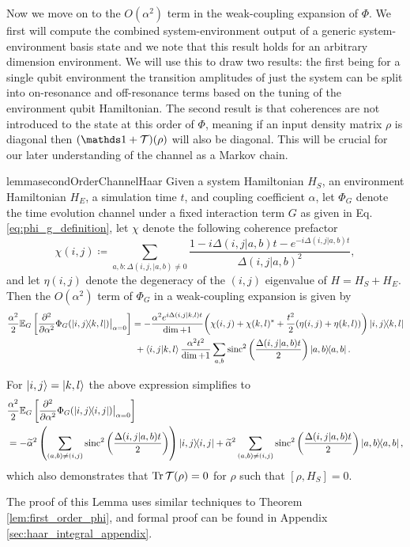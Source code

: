 Now we move on to the $O(\alpha^2)$ term in the weak-coupling expansion of $\Phi$. We first will compute the combined system-environment output of a generic system-environment basis state and we note that this result holds for an arbitrary dimension environment. We will use this to draw two results:  the first being for a single qubit environment the transition amplitudes of just the system can be split into on-resonance and off-resonance terms based on the tuning of the environment qubit Hamiltonian. The second result is that coherences are not introduced to the state at this order of $\Phi$, meaning if an input density matrix $\rho$ is diagonal then $(\identity + \mathcal{T})(\rho)$ will also be diagonal. This will be crucial for our later understanding of the channel as a Markov chain.
\begin{restatable}{lemma}{secondOrderChannelHaar} \label{lem:big_one}
    Given a system Hamiltonian $H_{S}$, an environment Hamiltonian $H_{E}$, a simulation time $t$, and coupling coefficient $\alpha$, let $\Phi_G$ denote the time evolution channel under a fixed interaction term $G$ as given in Eq. \eqref{eq:phi_g_definition}, let $\chi$ denote the following coherence prefactor
$$ \chi(i,j) \coloneqq \sum_{a,b: \Delta(i,j,|a,b) \neq 0} \frac{1 - i \Delta(i,j|a,b)t - e^{-i \Delta(i,j|a,b) t}}{\Delta(i,j|a,b)^2}, $$
and let $\eta(i,j)$ denote the degeneracy of the $(i,j)$ eigenvalue of $H = H_S + H_E$. Then the $O(\alpha^2)$ term of $\Phi_G$ in a weak-coupling expansion is given by
 \begin{align}
 \frac{\alpha^2}{2} \mathbb{E}_G \left[ \frac{\partial^2}{\partial \alpha^2} \Phi_G(\ketbra{i,j}{k,l}) \big|_{\alpha = 0} \right] &= -\frac{\alpha^2  e^{i \Delta(i,j|k,l) t}}{\dim + 1} \bigg(\chi(i,j) + \chi(k,l)^*  + \frac{t^2}{2}(\eta(i,j) + \eta(k,l)) \bigg) \ketbra{i,j}{k,l} \nonumber \\
    &~ + \braket{i,j}{k,l}  \frac{\alpha^2 t^2}{\dim+1} \sum_{a,b} \operatorname{sinc}^2 \left( \frac{\Delta(i,j|a,b)t}{2} \right) \ketbra{a,b}{a,b}.  \label{eq:el_gigante}
 \end{align}

 For $\ket{i, j} = \ket{k, l}$ the above expression simplifies to
 \begin{align}
     &\frac{\alpha^2}{2} \mathbb{E}_G \left[ \frac{\partial^2}{\partial \alpha^2} \Phi_G(\ketbra{i,j}{i,j}) \big|_{\alpha = 0} \right] \nonumber \\
     &=  - \widetilde{\alpha}^2 \left(\sum_{(a,b) \neq (i,j)} \operatorname{sinc}^2 \left(\frac{\Delta(i,j | a,b)t}{2} \right) \right) \ketbra{i, j}{i,j} + \widetilde{\alpha}^2 \sum_{(a,b) \neq (i,j)} \operatorname{sinc}^2 \left(\frac{\Delta(i,j | a,b)t}{2} \right) \ketbra{a, b}{a,b} ,\label{eq:el_gigante_dos}
 \end{align}
 which also demonstrates that $\Tr \mathcal{T}(\rho) = 0$ for $\rho$ such that $[\rho, H_S] = 0$.
\end{restatable}
\noindent The proof of this Lemma uses similar techniques to Theorem \ref{lem:first_order_phi}, and formal proof can be found in Appendix \ref{sec:haar_integral_appendix}.

